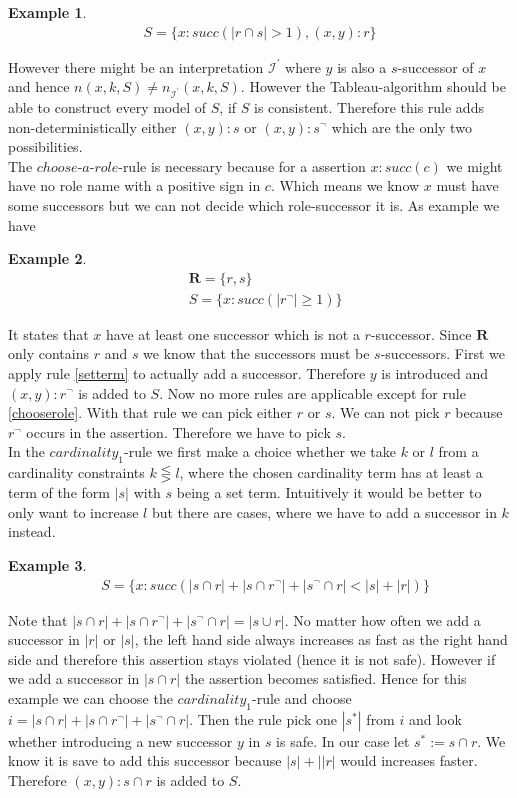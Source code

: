 \documentclass[a4paper,11pt]{scrartcl}
\theoremstyle{break}
\theoremstyle{definition}
\newtheorem{ex}{Example}
\begin{document}
\begin{ex}
\begin{align*}
S=\{x:succ(|r\cap s|>1), (x,y):r\}
\end{align*}
\end{ex}
However there might be an interpretation $\mathcal{I^\prime}$ where $y$ is also a $s$-successor of $x$ and hence $n(x,k,S)\neq n_{\mathcal{I}^\prime}(x,k,S)$. However the Tableau-algorithm should be able to construct every model of $S$, if $S$ is consistent. Therefore this rule adds non-deterministically either $(x,y):s$ or $(x,y):s^\neg$ which are the only two possibilities.\\
The $choose$-$a$-$role$-rule is necessary because for a assertion $x:succ(c)$ we might have no role name with a positive sign in $c$. Which means we know $x$ must have some successors but we can not decide which role-successor it is. As example we have
\begin{ex}
\begin{align*}
&\mathbf{R}=\{r,s\}\\
&S=\{x:succ(|r^\neg|\geq 1)\}
\end{align*} 
\end{ex}
It states that $x$ have at least one successor which is not a $r$-successor. Since $\mathbf{R}$ only contains $r$ and $s$ we know that the successors must be $s$-successors. First we apply rule \ref{setterm} to actually add a successor. Therefore $y$ is introduced and $(x,y):r^\neg$ is added to $S$. Now no more rules are applicable except for rule \ref{chooserole}. With that rule we can pick either $r$ or $s$. We can not pick $r$ because $r^\neg$ occurs in the assertion. Therefore we have to pick $s$.\\
In the $cardinality_1$-rule we first make a choice whether we take $k$ or $l$ from a cardinality constraints $k\lesseqgtr l$, where the chosen cardinality term has at least a term of the form $|s|$ with $s$ being a set term. Intuitively it would be better to only want to increase $l$ but there are cases, where we have to add a successor in $k$ instead.
\begin{ex}
\begin{align*}
&S=\{x:succ(|s\cap r|+|s\cap r^\neg|+|s^\neg\cap r|<|s|+|r|)\}
\end{align*}
\end{ex}
Note that $|s\cap r|+|s\cap r^\neg|+|s^\neg\cap r|=|s\cup r|$. No matter how often we add a successor in $|r|$ or $|s|$, the left hand side always increases as fast as the right hand side and therefore this assertion stays violated (hence it is not safe). However if we add a successor in $|s\cap r|$ the assertion becomes satisfied. Hence for this example we can choose the $cardinality_1$-rule and choose $i=|s\cap r|+|s\cap r^\neg|+|s^\neg\cap r|$. Then the rule pick one $|s^\ast|$ from $i$ and look whether introducing a new successor $y$ in $s$ is safe. In our case let $s^\ast:=s\cap r$. We know it is save to add this successor because $|s|+||r|$ would increases faster. Therefore $(x,y):s\cap r$ is added to $S$.\\
\end{document}

